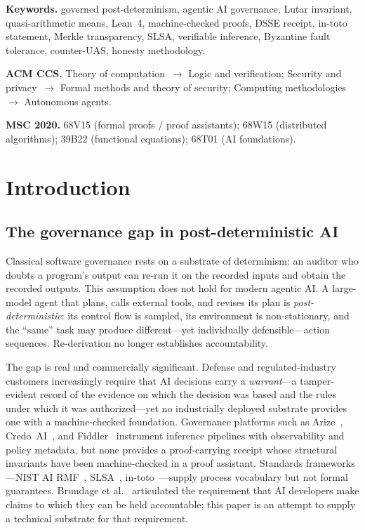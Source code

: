 \documentclass[11pt,letterpaper]{article}
\theoremstyle{definition}
\begin{document}
\noindent\textbf{Keywords.} governed post-determinism, agentic AI governance,
Lutar invariant, quasi-arithmetic means, Lean~4, machine-checked proofs,
DSSE receipt, in-toto statement, Merkle transparency, SLSA, verifiable
inference, Byzantine fault tolerance, counter-UAS, honesty methodology.

\smallskip
\noindent\textbf{ACM CCS.} Theory of computation~$\to$ Logic and verification;
Security and privacy~$\to$ Formal methods and theory of security;
Computing methodologies~$\to$ Autonomous agents.

\noindent\textbf{MSC 2020.} 68V15 (formal proofs / proof assistants);
68W15 (distributed algorithms); 39B22 (functional equations);
68T01 (AI foundations).

\tableofcontents

\section{Introduction}
\label{sec:intro}

\subsection{The governance gap in post-deterministic AI}

Classical software governance rests on a substrate of determinism: an auditor
who doubts a program's output can re-run it on the recorded inputs and obtain
the recorded outputs.  This assumption does not hold for modern agentic AI.  A
large-model agent that plans, calls external tools, and revises its plan is
\emph{post-deterministic}: its control flow is sampled, its environment is
non-stationary, and the ``same'' task may produce different---yet individually
defensible---action sequences.  Re-derivation no longer establishes
accountability.

The gap is real and commercially significant.  Defense and regulated-industry
customers increasingly require that AI decisions carry a \emph{warrant}---a
tamper-evident record of the evidence on which the decision was based and the
rules under which it was authorized---yet no industrially deployed substrate
provides one with a machine-checked foundation.  Governance platforms such as
Arize~\cite{arize2024}, Credo~AI~\cite{credoai2024}, and Fiddler~\cite{fiddler2024}
instrument inference pipelines with observability and policy metadata, but none
provides a proof-carrying receipt whose structural invariants have been
machine-checked in a proof assistant.  Standards frameworks---NIST AI
RMF~\cite{nist_rmf}, SLSA~\cite{slsa}, in-toto~\cite{intoto}---supply process
vocabulary but not formal guarantees.  Brundage et al.~\cite{brundage2020}
articulated the requirement that AI developers make claims to which they can be
held accountable; this paper is an attempt to supply a technical substrate for
that requirement.
\end{document}
